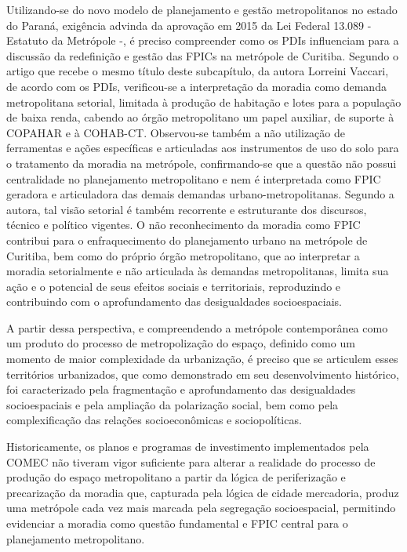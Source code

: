 	Utilizando-se do novo modelo de planejamento e gestão metropolitanos no estado do Paraná, exigência advinda da aprovação em 2015 da Lei Federal 13.089 - Estatuto da Metrópole -, é preciso compreender como os PDIs influenciam para a discussão da redefinição e gestão das FPICs na metrópole de Curitiba. Segundo o artigo que recebe o mesmo título deste subcapítulo, da autora Lorreini Vaccari, de acordo com os PDIs, verificou-se a interpretação da moradia como demanda metropolitana setorial, limitada à produção de habitação e lotes para a população de baixa renda, cabendo ao órgão metropolitano um papel auxiliar, de suporte à COPAHAR e à COHAB-CT. Observou-se também a não utilização de ferramentas e ações específicas e articuladas aos instrumentos de uso do solo para o tratamento da moradia na metrópole, confirmando-se que a questão não possui centralidade no planejamento metropolitano e nem é interpretada como FPIC geradora e articuladora das demais demandas urbano-metropolitanas. Segundo a autora, tal visão setorial é também recorrente e estruturante dos discursos, técnico e político vigentes. O não reconhecimento da moradia como FPIC contribui para o enfraquecimento do planejamento urbano na metrópole de Curitiba, bem como do próprio órgão metropolitano, que ao interpretar a moradia setorialmente e não articulada às demandas metropolitanas, limita sua ação e o potencial de seus efeitos sociais e territoriais, reproduzindo e contribuindo com o aprofundamento das desigualdades socioespaciais.
	
	A partir dessa perspectiva, e compreendendo a metrópole contemporânea como um produto do processo de metropolização do espaço, definido como um momento de maior complexidade da urbanização, é preciso que se articulem esses territórios urbanizados, que como demonstrado em seu desenvolvimento histórico, foi caracterizado pela fragmentação e aprofundamento das desigualdades socioespaciais e pela ampliação da polarização social, bem como pela complexificação das relações socioeconômicas e sociopolíticas.
	
	Historicamente, os planos e programas de investimento implementados pela COMEC não tiveram vigor suficiente para alterar a realidade do processo de produção do espaço metropolitano a partir da lógica de periferização e precarização da moradia que, capturada pela lógica de cidade mercadoria, produz uma metrópole cada vez mais marcada pela segregação socioespacial, permitindo evidenciar a moradia como questão fundamental e FPIC central para o planejamento metropolitano. 
	
